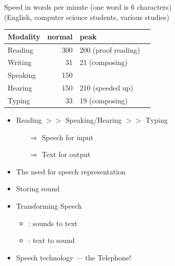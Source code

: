 \documentclass[a4paper,landscape,headrule,footrule,xetex]{foils}
\begin{document}
Speed in words per minute (one word is 6 characters)
\\ (English, computer science students, various studies)

\begin{tabular}{lrlr}
  Modality & normal & peak \\ \hline 
  Reading            & 300 & 200 (proof reading)\\
  Writing              & 31 & 21 (composing) \\ 
  Speaking             & 150 & \\
  Hearing              & 150 & 210 (speeded up)  \\
  Typing               & 33  & 19 (composing) 
\end{tabular}
\begin{itemize}
\item Reading $>>$ Speaking/Hearing $>>$ Typing
  \begin{itemize}
  \item[$\Rightarrow$] Speech for input
  \item[$\Rightarrow$] Text for output
  \end{itemize}
\end{itemize}




\begin{itemize}
\item The need for speech representation
\item Storing sound
\item Transforming Speech
  \begin{itemize}
  \item {}: sounds to text
  \item {}: text to sound
  \end{itemize}
\item Speech technology --- the Telephone!
\end{itemize}


\end{document}
